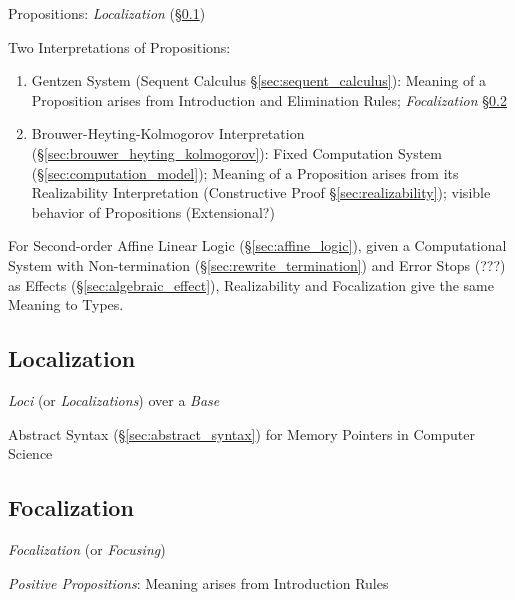 Propositions: \emph{Localization} (\S\ref{sec:localization})

Two Interpretations of Propositions:

\begin{enumerate}
  \item Gentzen System (Sequent Calculus
    \S\ref{sec:sequent_calculus}): Meaning of a Proposition arises
    from Introduction and Elimination Rules; \emph{Focalization}
    \S\ref{sec:focalization}

  \item Brouwer-Heyting-Kolmogorov Interpretation
    (\S\ref{sec:brouwer_heyting_kolmogorov}): Fixed Computation System
    (\S\ref{sec:computation_model}); Meaning of a Proposition arises
    from its Realizability Interpretation (Constructive Proof
    \S\ref{sec:realizability}); visible behavior of Propositions
    (Extensional?)
\end{enumerate}

For Second-order Affine Linear Logic (\S\ref{sec:affine_logic}), given
a Computational System with Non-termination
(\S\ref{sec:rewrite_termination}) and Error Stops (???) as Effects
(\S\ref{sec:algebraic_effect}), Realizability and Focalization give
the same Meaning to Types.



\subsection{Localization}\label{sec:localization}

\emph{Loci} (or \emph{Localizations}) over a \emph{Base}

Abstract Syntax (\S\ref{sec:abstract_syntax}) for Memory Pointers in
Computer Science



\subsection{Focalization}\label{sec:focalization}

\emph{Focalization} (or \emph{Focusing})

\emph{Positive Propositions}: Meaning arises from Introduction Rules

